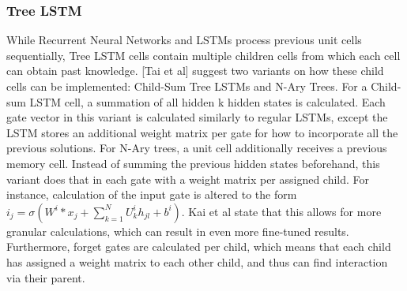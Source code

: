 \subsubsection{Tree LSTM}
While Recurrent Neural Networks and LSTMs process previous unit cells
sequentially, Tree LSTM cells \cite{DBLP:journals/corr/TaiSM15}
\cite{DBLP:journals/corr/ZhuSG15} \cite{DBLP:journals/corr/LeZ15} contain
multiple children cells from which each cell can obtain past knowledge. [Tai et
al] suggest two variants on how these child cells can be implemented: Child-Sum
Tree LSTMs and N-Ary Trees. For a Child-sum LSTM cell, a summation of all hidden
k hidden states is calculated. Each gate vector in this variant is calculated
similarly to regular LSTMs, except the LSTM stores an additional weight matrix
per gate for how to incorporate all the previous solutions. For N-Ary trees, a
unit cell additionally receives a previous memory cell. Instead of summing the
previous hidden states beforehand, this variant does that in each gate with a
weight matrix per assigned child. For instance, calculation of the input gate is
altered to the form $i_j=\sigma(W^i*x_j +
\sum\limits_{k=1}^{N}U_k^{i}h_{jl}+b^i)$. Kai et al state that this allows for
more granular calculations, which can result in even more fine-tuned results.
Furthermore, forget gates are calculated per child, which means that each child
has assigned a weight matrix to each other child, and thus can find interaction
via their parent. 